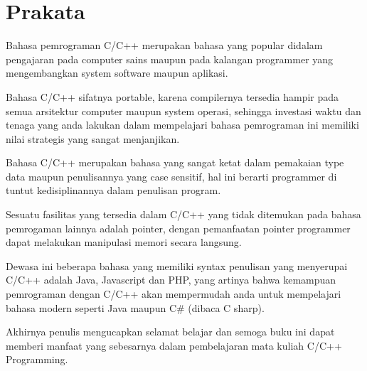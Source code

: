 \chapter*{Prakata}\label{prakata}

Bahasa pemrograman C/C++ merupakan bahasa yang popular didalam
pengajaran pada computer sains maupun pada kalangan programmer yang
mengembangkan system software maupun aplikasi.

Bahasa C/C++ sifatnya portable, karena compilernya tersedia hampir pada
semua arsitektur computer maupun system operasi, sehingga investasi
waktu dan tenaga yang anda lakukan dalam mempelajari bahasa pemrograman
ini memiliki nilai strategis yang sangat menjanjikan.

Bahasa C/C++ merupakan bahasa yang sangat ketat dalam pemakaian type
data maupun penulisannya yang case sensitif, hal ini berarti programmer
di tuntut kedisiplinannya dalam penulisan program.

Sesuatu fasilitas yang tersedia dalam C/C++ yang tidak ditemukan pada
bahasa pemrogaman lainnya adalah pointer, dengan pemanfaatan pointer
programmer dapat melakukan manipulasi memori secara langsung.

Dewasa ini beberapa bahasa yang memiliki syntax penulisan yang
menyerupai C/C++ adalah Java, Javascript dan PHP, yang artinya bahwa
kemampuan pemrograman dengan C/C++ akan mempermudah anda untuk
mempelajari bahasa modern seperti Java maupun C\# (dibaca C sharp).

Akhirnya penulis mengucapkan selamat belajar dan semoga buku ini dapat
memberi manfaat yang sebesarnya dalam pembelajaran mata kuliah C/C++
Programming.
